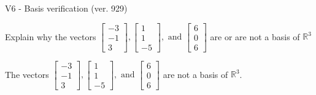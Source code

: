 \begin{exercise}
  \begin{exerciseTitle}V6 - Basis verification (ver. 929)\end{exerciseTitle}
  \begin{exerciseStatement}
    Explain why the vectors \(\left[\begin{array}{r}
-3 \\
-1 \\
3
\end{array}\right] , \left[\begin{array}{r}
1 \\
1 \\
-5
\end{array}\right] , \text{ and } \left[\begin{array}{r}
6 \\
0 \\
6
\end{array}\right]\) are or are not a basis of \(\mathbb{R}^3\)	


  \end{exerciseStatement}
  \begin{exerciseAnswer}
   The vectors \(\left[\begin{array}{r}
-3 \\
-1 \\
3
\end{array}\right] , \left[\begin{array}{r}
1 \\
1 \\
-5
\end{array}\right] , \text{ and } \left[\begin{array}{r}
6 \\
0 \\
6
\end{array}\right]\) 
  	 are not  a basis of \(\mathbb{R}^3\).
  


  \end{exerciseAnswer}
\end{exercise}